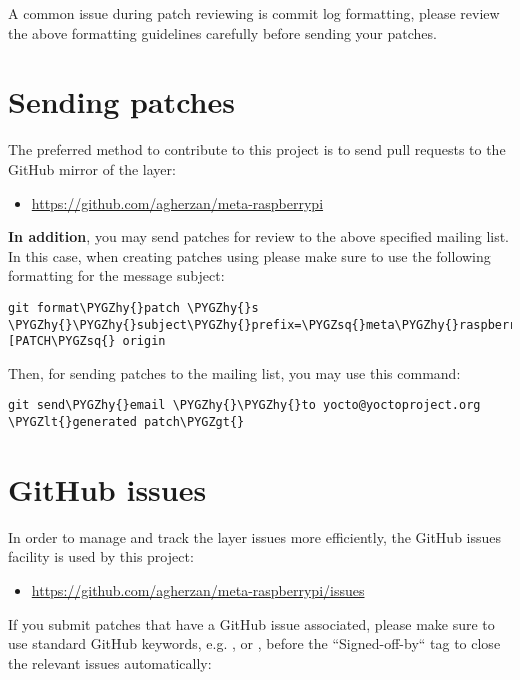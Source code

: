 \documentclass[letterpaper,10pt,english]{sphinxmanual}
\def\PYGZlt{\char`\<}
\def\PYGZgt{\char`\>}
\def\PYGZhy{\char`\-}
\def\PYGZsq{\char`\'}
\renewcommand\PYGZsq{\textquotesingle}
\begin{document}
A common issue during patch reviewing is commit log formatting, please review
the above formatting guidelines carefully before sending your patches.


\section{Sending patches}
\label{contributing:sending-patches}
The preferred method to contribute to this project is to send pull
requests to the GitHub mirror of the layer:
\begin{itemize}
\item {} 
\href{https://github.com/agherzan/meta-raspberrypi}{https://github.com/agherzan/meta-raspberrypi}

\end{itemize}

\textbf{In addition}, you may send patches for review to the above specified
mailing list. In this case, when creating patches using  please make
sure to use the following formatting for the message subject:

\begin{Verbatim}[commandchars=\\\{\}]
git format\PYGZhy{}patch \PYGZhy{}s \PYGZhy{}\PYGZhy{}subject\PYGZhy{}prefix=\PYGZsq{}meta\PYGZhy{}raspberrypi][PATCH\PYGZsq{} origin
\end{Verbatim}

Then, for sending patches to the mailing list, you may use this command:

\begin{Verbatim}[commandchars=\\\{\}]
git send\PYGZhy{}email \PYGZhy{}\PYGZhy{}to yocto@yoctoproject.org \PYGZlt{}generated patch\PYGZgt{}
\end{Verbatim}


\section{GitHub issues}
\label{contributing:github-issues}
In order to manage and track the layer issues more efficiently, the
GitHub issues facility is used by this project:
\begin{itemize}
\item {} 
\href{https://github.com/agherzan/meta-raspberrypi/issues}{https://github.com/agherzan/meta-raspberrypi/issues}

\end{itemize}

If you submit patches that have a GitHub issue associated, please make sure to
use standard GitHub keywords, e.g. ,  or , before the
``Signed-off-by`` tag to close the relevant issues automatically:
\end{document}
